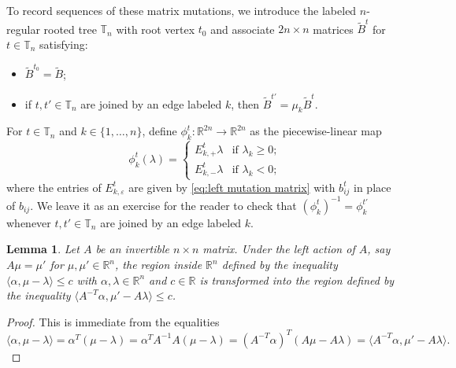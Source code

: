 \documentclass{amsart}
\newtheorem{lemma}[theorem]{Lemma}
\numberwithin{theorem}{section}
\newcommand{\RR}{\mathbb{R}}
\newcommand{\TT}{\mathbb{T}}
\begin{document}
  To record sequences of these matrix mutations, we introduce the labeled $n$-regular rooted tree $\TT_n$ with root vertex $t_0$ and associate $2n\times n$ matrices $\tilde{B}^t$ for $t\in\TT_n$ satisfying:
  \begin{itemize}
    \item $\tilde{B}^{t_0}=\tilde{B}$;
    \item if $t,t'\in\TT_n$ are joined by an edge labeled $k$, then $\tilde{B}^{t'}=\mu_k \tilde{B}^t$.
  \end{itemize}

  For $t\in\TT_n$ and $k\in\{1,\ldots,n\}$, define $\phi^t_k:\RR^{2n}\to\RR^{2n}$ as the piecewise-linear map
  \[
    \phi^t_k(\lambda)=\begin{cases} E^t_{k,+}\lambda & \text{if $\lambda_k\ge0$;}\\ E^t_{k,-}\lambda & \text{if $\lambda_k<0$;} \end{cases}
  \]
  where the entries of $E^t_{k,\varepsilon}$ are given by \eqref{eq:left mutation matrix} with $b^t_{ij}$ in place of $b_{ij}$.
  We leave it as an exercise for the reader to check that $(\phi^t_k)^{-1}=\phi^{t'}_k$ whenever $t,t'\in\TT_n$ are joined by an edge labeled $k$.

  \begin{lemma}
    \label{le:transformed inequalities}
    Let $A$ be an invertible $n\times n$ matrix.
    Under the left action of $A$, say $A\mu=\mu'$ for $\mu,\mu'\in\RR^n$, the region inside $\RR^n$ defined by the inequality $\langle\alpha,\mu-\lambda\rangle\le c$ with $\alpha,\lambda\in\RR^n$ and $c\in\RR$ is transformed into the region defined by the inequality $\langle A^{-T}\alpha,\mu'-A\lambda\rangle\le c$.
  \end{lemma}
  \begin{proof}
    This is immediate from the equalities
    \[
      \langle\alpha,\mu-\lambda\rangle=\alpha^T(\mu-\lambda)=\alpha^TA^{-1}A(\mu-\lambda)=(A^{-T}\alpha)^T(A\mu-A\lambda)=\langle A^{-T}\alpha,\mu'-A\lambda\rangle.
    \]
  \end{proof}
\end{document}

